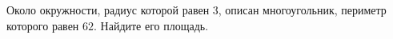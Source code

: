 \begin{ex}
	\begin{condition}
		Около окружности, радиус которой равен \( 3 \), описан многоугольник, периметр которого равен \( 62 \). Найдите его площадь.
	\end{condition}
\end{ex}